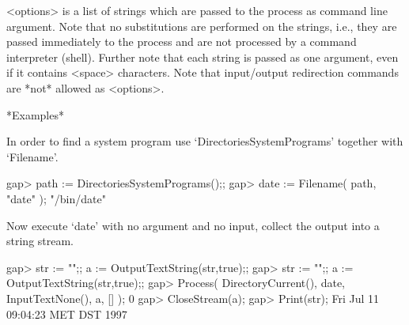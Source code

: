 <options> is a list of strings which are passed to the process as command
line argument.  Note that no substitutions are  performed on the strings,
i.e., they are passed immediately to the process and are not processed by
a command interpreter (shell).   Further note that  each string is passed
as one  argument,  even if it  contains  <space>  characters.  Note  that
input/output redirection commands are *not* allowed as <options>.

*Examples*

In   order to  find   a  system program  use  `DirectoriesSystemPrograms'
together with `Filename'.

\begintt
   gap> path := DirectoriesSystemPrograms();;
   gap> date := Filename( path, "date" );
   "/bin/date"
\endtt

Now execute `date' with no argument and no input, collect the output into
a string stream.

\begintt
    gap> str := "";; a := OutputTextString(str,true);;
    gap> str := "";; a := OutputTextString(str,true);;
    gap> Process( DirectoryCurrent(), date, InputTextNone(), a, [] );
    0
    gap> CloseStream(a);
    gap> Print(str);   
    Fri Jul 11 09:04:23 MET DST 1997
\endtt


